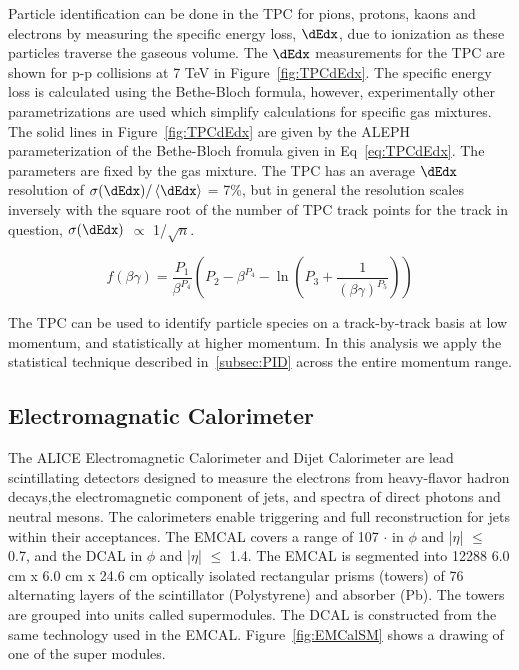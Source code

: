 Particle identification can be done in the TPC for pions, protons, kaons and
electrons by measuring the specific energy loss, $\dEdx$, due to ionization as these particles
traverse the gaseous volume. The $\dEdx$ measurements for the TPC are shown for p-p collisions at 7 TeV in Figure~\ref{fig:TPCdEdx}. The specific energy loss is calculated using the Bethe-Bloch formula, however, experimentally other parametrizations are used which simplify calculations for specific gas mixtures. The solid lines in Figure~\ref{fig:TPCdEdx} are given by the ALEPH parameterization of the Bethe-Bloch fromula given in Eq~\ref{eq:TPCdEdx}. The parameters are fixed by the gas mixture. The TPC has an average $\dEdx$ resolution of $\sigma(\dEdx)/\left<\dEdx\right>$ = 7\%, but in general the resolution scales inversely with the square root of the number of TPC track points for the track in question, $\sigma(\dEdx)$ $\propto$ 1/$\sqrt{n}$.

\begin{equation}\label{eq:TPCdEdx}
    f(\beta \gamma) = \frac{P_1}{\beta^{P_4}}\left(P_2 - \beta^{P_4} - \ln \left(P_3 + \frac{1}{(\beta \gamma)^{P_5}}\right)\right)
\end{equation}

The TPC can be used to identify particle species on a track-by-track basis at low momentum, and statistically at higher momentum. In this analysis we apply the statistical technique described in~\ref{subsec:PID} across the entire momentum range. 

\subsection*{Electromagnatic Calorimeter}\label{subsec:EMCal}

The ALICE Electromagnetic Calorimeter and Dijet Calorimeter are lead scintillating detectors designed to measure the electrons from heavy-flavor hadron decays,the electromagnetic component of jets, and spectra of direct photons and neutral mesons. The calorimeters enable triggering and full reconstruction for jets within their acceptances. The EMCAL covers a range of 107 $\cdot$ in $\phi$ and |$\eta$| $\leq$ 0.7, and the DCAL in $\phi$ and |$\eta$| $\leq$ 1.4. The EMCAL is segmented into 12288 6.0 cm x 6.0 cm x 24.6 cm optically isolated rectangular prisms (towers) of 76 alternating layers of the scintillator (Polystyrene) and absorber (Pb). The towers are grouped into units called supermodules. The DCAL is constructed from the same technology used in the EMCAL. Figure~\ref{fig:EMCalSM} shows a drawing of one of the super modules.

